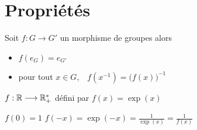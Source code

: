 \section{Propriétés}

\begin{frame}


\begin{proposition}
Soit $f : G \longrightarrow G'$ un morphisme de groupes alors 
\begin{itemize}
  \item $f(e_G) = e_{G'}$
\pause
  \item pour tout $x \in G$,\ \  $f(x^{-1}) = \big(f(x)\big)^{-1}$
\end{itemize} 
\end{proposition}

\pause
\bigskip

\begin{exemple}
$f : \mathbb{R} \longrightarrow \mathbb{R}_+^*$ défini par $f(x)= \exp(x)$

\pause
\medskip

\centerline{$f(0)=1$ \pause\qquad $f(-x)= \exp(-x)= \frac{1}{\exp(x)}=\frac{1}{f(x)}$}
\end{exemple}
 
\end{frame}



